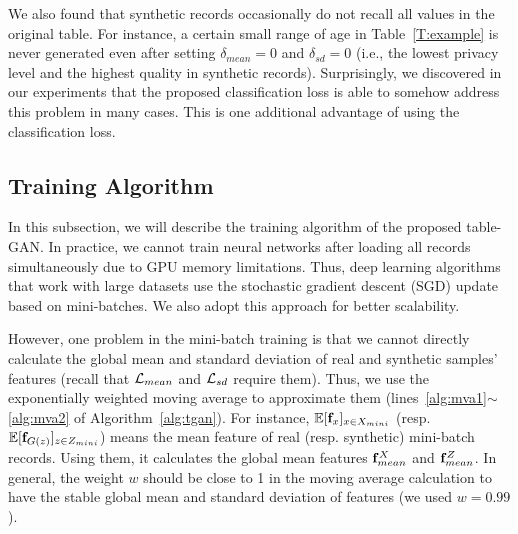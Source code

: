 We also found that synthetic records occasionally do not recall all values in the original table. For instance, a certain small range of age in Table~\ref{T:example} is never generated even after setting $\delta_{mean}=0$ and $\delta_{sd}=0$ (i.e., the lowest privacy level and the highest quality in synthetic records). Surprisingly, we discovered in our experiments that the proposed classification loss is able to somehow address this problem in many cases. This is one additional advantage of using the classification loss.

\subsection{Training Algorithm}
In this subsection, we will describe the training algorithm of the proposed table-GAN. In practice, we cannot train neural networks after loading all records simultaneously due to GPU memory limitations. Thus, deep learning algorithms that work with large datasets use the stochastic gradient descent (SGD) update based on mini-batches. We also adopt this approach for better scalability.

However, one problem in the mini-batch training is that we cannot directly calculate the global mean and standard deviation of real and synthetic samples' features (recall that $\mathcal{L}_{mean}$ and $\mathcal{L}_{sd}$ require them). Thus, we use the exponentially weighted moving average to approximate them (lines~\ref{alg:mva1}$\sim$\ref{alg:mva2} of Algorithm~\ref{alg:tgan}). For instance, $\mathbb{E}[\mathbf{f}_x]_{x \in X_{mini}}$ (resp. $\mathbb{E}[\mathbf{f}_{G(z)}]_{z \in Z_{mini}}$) means the mean feature of real (resp. synthetic) mini-batch records. Using them, it calculates the global mean features $\mathbf{f}_{mean}^X$ and $\mathbf{f}_{mean}^Z$. In general, the weight $w$ should be close to 1 in the moving average calculation to have the stable global mean and standard deviation of features (we used $w=0.99$).

